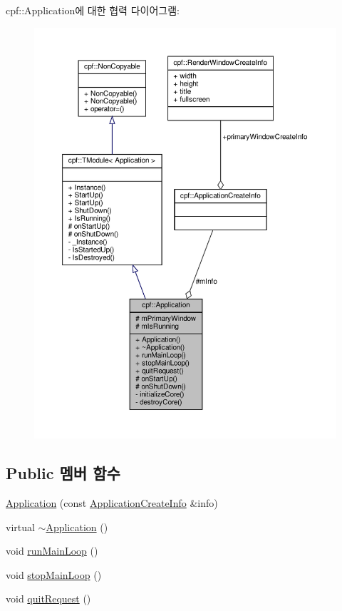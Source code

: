 cpf\+:\+:Application에 대한 협력 다이어그램\+:
\nopagebreak
\begin{figure}[H]
\begin{center}
\leavevmode
\includegraphics[width=350pt]{classcpf_1_1_application__coll__graph}
\end{center}
\end{figure}
\subsection*{Public 멤버 함수}
\begin{DoxyCompactItemize}
\item 
\hyperlink{classcpf_1_1_application_a82aea6d89660d4ae9898a437f96d2e42}{Application} (const \hyperlink{structcpf_1_1_application_create_info}{Application\+Create\+Info} \&info)
\item 
virtual \hyperlink{classcpf_1_1_application_ad018a98c533cbf877ae11a05b329c4a2}{$\sim$\+Application} ()
\item 
void \hyperlink{classcpf_1_1_application_a52e76d84434e072ad6dafdf7a0f4fd59}{run\+Main\+Loop} ()
\item 
void \hyperlink{classcpf_1_1_application_a527bcad0b3cf7a33ccc8de9318c6d984}{stop\+Main\+Loop} ()
\item 
void \hyperlink{classcpf_1_1_application_ac5c5b81ebccee1f09d777a9fc200eca6}{quit\+Request} ()
\end{DoxyCompactItemize}
